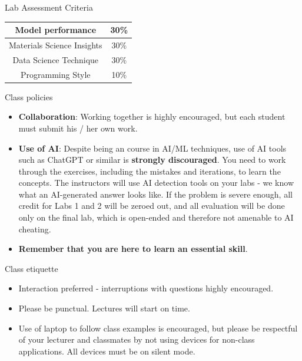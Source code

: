 \documentclass[aspectratio=169]{beamer}
\begin{document}
\begin{frame}{Lab Assessment Criteria}
\begin{table}[]
    \centering
    \begin{tabular}{|c|c|}
    \hline
Model performance & 30\%\\
\hline
Materials Science Insights & 30\%\\
\hline
Data Science Technique & 30\%\\
\hline
Programming Style & 10\%\\
\hline
    \end{tabular}
\end{table}
\end{frame}

\begin{frame}{Class policies}
    \begin{itemize}
        \item \textbf{Collaboration}:  Working together is highly encouraged, but each student must submit his / her own work.
        \item \textbf{Use of AI}: Despite being an course in AI/ML techniques, use of AI tools such as ChatGPT or similar is \textbf{strongly discouraged}. You need to work through the exercises, including the mistakes and iterations, to learn the concepts. The instructors will use AI detection tools on your labs - we know what an AI-generated answer looks like. If the problem is severe enough, all credit for Labs 1 and 2 will be zeroed out, and all evaluation will be done only on the final lab, which is open-ended and therefore not amenable to AI cheating.
        \item \textbf{Remember that you are here to learn an essential skill}.
    \end{itemize}
\end{frame}


\begin{frame}{Class etiquette}
    \begin{itemize}
        \item Interaction preferred - interruptions with questions highly encouraged.
        \item Please be punctual. Lectures will start on time.
        \item Use of laptop to follow class examples is encouraged, but please be respectful of your lecturer and classmates by not using devices for non-class applications.  All devices must be on silent mode.
    \end{itemize}
\end{frame}
\end{document}
